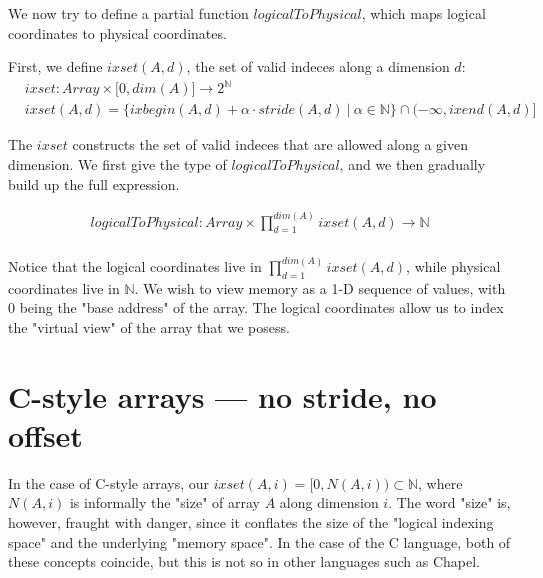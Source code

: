 \documentclass{article}
\newcommand{\naturals}{\mathbb{N}}
\begin{document}
We now try to define a partial function $logicalToPhysical$, which maps
logical coordinates to physical coordinates.

First, we define $ixset(A, d)$, the set of valid indeces along a dimension $d$:
\begin{align*}
    &ixset: Array \times \lbrack 0, dim(A) \rbrack \to 2^\naturals\\
    &ixset(A, d) = \{ ixbegin(A, d) + \alpha \cdot stride(A, d)~\vert~ \alpha \in \naturals \} \cap (-\infty, ixend(A, d) \rbrack
\end{align*}

The $ixset$ constructs the set of valid indeces that are allowed along
a given dimension. We first give the type of $logicalToPhysical$, and
we then gradually build up the full expression.

\begin{align*}
    logicalToPhysical: Array \times \prod_{d=1}^{dim(A)} ixset(A, d) \to \naturals \\
\end{align*}

Notice that the logical coordinates live in $\prod_{d=1}^{dim(A)} ixset(A, d)$,
while physical coordinates live in $\naturals$. We wish to view memory
as a 1-D sequence of values, with $0$ being the "base address" of the array.
The logical coordinates allow us to index the "virtual view" of the array
that we posess.

\section{C-style arrays --- no stride, no offset}
In the case of C-style arrays, our $ixset(A, i) = \big\lbrack 0, N(A, i) \big) \subset \naturals$,
where $N(A, i)$ is informally the "size" of array $A$ along dimension $i$.
The word "size" is, however, fraught with danger, since it conflates
the size of the "logical indexing space" and the underlying "memory space".
In the case of the C language, both of these concepts coincide, but this
is not so in other languages such as Chapel.
\end{document}
